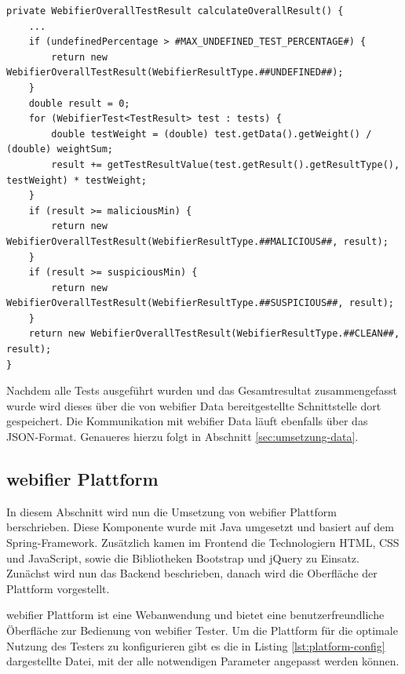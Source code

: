 \begin{scriptsize}
\begin{lstlisting}
private WebifierOverallTestResult calculateOverallResult() {
    ...
    if (undefinedPercentage > #MAX_UNDEFINED_TEST_PERCENTAGE#) {
        return new WebifierOverallTestResult(WebifierResultType.##UNDEFINED##);
    }
    double result = 0;
    for (WebifierTest<TestResult> test : tests) {
        double testWeight = (double) test.getData().getWeight() / (double) weightSum;
        result += getTestResultValue(test.getResult().getResultType(), testWeight) * testWeight;
    }
    if (result >= maliciousMin) {
        return new WebifierOverallTestResult(WebifierResultType.##MALICIOUS##, result);
    }
    if (result >= suspiciousMin) {
        return new WebifierOverallTestResult(WebifierResultType.##SUSPICIOUS##, result);
    }
    return new WebifierOverallTestResult(WebifierResultType.##CLEAN##, result);
}
\end{lstlisting}
\end{scriptsize}

Nachdem alle Tests ausgeführt wurden und das Gesamtresultat zusammengefasst wurde wird dieses über die von webifier Data bereitgestellte Schnittstelle dort gespeichert. Die Kommunikation mit webifier Data läuft ebenfalls über das \ac{JSON}-Format. Genaueres hierzu folgt in Abschnitt \ref{sec:umsetzung-data}.

\subsection{webifier Plattform}

In diesem Abschnitt wird nun die Umsetzung von webifier Plattform berschrieben. Diese Komponente wurde mit Java umgesetzt und basiert auf dem Spring-Framework. Zusätzlich kamen im Frontend die Technologiern \ac{HTML}, \ac{CSS} und JavaScript, sowie die Bibliotheken Bootstrap und jQuery zu Einsatz. Zunächst wird nun das Backend beschrieben, danach wird die Oberfläche der Plattform vorgestellt.

webifier Plattform ist eine Webanwendung und bietet eine benutzerfreundliche Öberfläche zur Bedienung von webifier Tester. Um die Plattform für die optimale Nutzung des Testers zu konfigurieren gibt es die in Listing \ref{lst:platform-config} dargestellte Datei, mit der alle notwendigen Parameter angepasst werden können.

